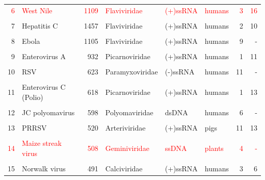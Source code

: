 \documentclass[landscape]{slides}
\begin{document}
\begin{slide}
\begin{center}
\begin{tabular}{r|l|r|l|l|l|r|r}
     \textcolor{red}{6} & \textcolor{red}{West Nile}          &        \textcolor{red}{1109} & \textcolor{red}{Flaviviridae}   & \textcolor{red}{(+)ssRNA} & \textcolor{red}{humans} &     \textcolor{red}{3} &      \textcolor{red}{16}  \\
       &                    &              &                &          &        &       &          \\ 
     7 & Hepatitis C        &        1457  & Flaviviridae   & (+)ssRNA & humans &     2 &      10  \\
       &                    &              &                &          &        &       &          \\ 
     8 & Ebola              &        1105  & Flaviviridae   & (+)ssRNA & humans &     9 &       -  \\
       &                    &              &                &          &        &       &          \\ 
     9 & Enterovirus A      &         932  & Picarnoviridae & (+)ssRNA & humans &     1 &      11  \\
       &                    &              &                &          &        &       &          \\ 
    10 & RSV                &         623  & Paramyxoviridae& (-)ssRNA & humans &    11 &       -  \\
       &                    &              &                &          &        &       &          \\ 
    11 & Enterovirus C (Polio) &      618  & Picarnoviridae & (+)ssRNA & humans &     1 &      13  \\
       &                    &              &                &          &        &       &          \\ 
    12 & JC polyomavirus    &          598 & Polyomaviridae & dsDNA    & humans &     6 &       -  \\
       &                    &              &                &          &        &       &          \\ 
    13 & PRRSV              &          520 & Arteriviridae  & (+)ssRNA & pigs   &    11 &      13  \\ %
       &                    &              &                &          &        &       &          \\ 
    \textcolor{red}{14} & \textcolor{red}{Maize streak virus} &          \textcolor{red}{508} & \textcolor{red}{Geminiviridae}  & \textcolor{red}{ssDNA}    & \textcolor{red}{plants} &     \textcolor{red}{4} &      \textcolor{red}{-}   \\
       &                    &              &                &          &        &       &          \\ 
    15 & Norwalk virus      &          491 &  Calciviridae  & (+)ssRNA & humans &     3 &       6  \\ 
\end{tabular}

\end{center}

\vfill
\end{slide}
\end{document}
